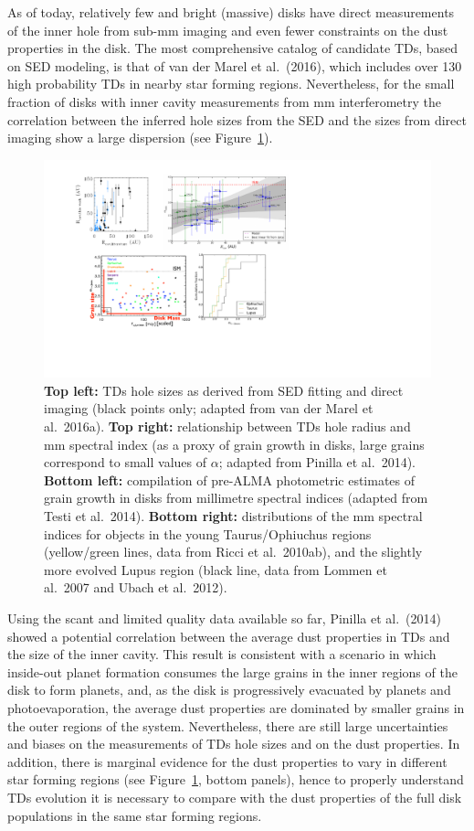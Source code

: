 \documentclass[10pt,fleqn,twoside]{article}
\begin{document}
As of today, relatively few and bright (massive) disks have direct measurements of the inner hole from sub-mm imaging
and even fewer constraints on the dust properties in the disk. The most comprehensive catalog of candidate TDs, based on SED modeling, is that of van der Marel et al.~(2016), which includes over 130 high probability TDs in nearby star forming regions. Nevertheless, for the small fraction of disks with inner cavity measurements from mm interferometry the correlation between the inferred hole sizes from the SED and the sizes from direct imaging show a large dispersion (see Figure~\ref{f_TDsiz}). 
\begin{figure}
\includegraphics[scale=0.7]{f_dust_radii_tds.pdf}
\caption{{\bf Top left:} TDs hole sizes as derived from SED fitting and direct imaging (black points only; adapted from van der Marel et al.~2016a). {\bf Top right:} relationship between TDs hole radius and mm spectral index (as a proxy of grain growth in disks, large grains correspond to small values of $\alpha$; adapted from Pinilla et al.~2014). {\bf Bottom left:} compilation of pre-ALMA photometric estimates of grain growth in disks from millimetre spectral indices (adapted from Testi et al.~2014). {\bf Bottom right:} distributions of the mm spectral indices for objects in the young Taurus/Ophiuchus regions (yellow/green lines, data from Ricci et al.~2010ab), and the slightly more evolved Lupus region (black line, data from Lommen et al.~2007 and Ubach et al.~2012).}
\label{f_TDsiz}
\end{figure}
Using the scant and limited quality data available so far, Pinilla et al.~(2014) showed a potential correlation between the average dust properties in TDs and the size of the inner cavity. This result is consistent with a scenario in which inside-out planet formation consumes the large grains in the inner regions of the disk to form planets, and, as the disk is progressively evacuated by planets and photoevaporation, the average dust properties are dominated by smaller grains in the outer regions of the
system. Nevertheless, there are still large uncertainties and biases on the measurements of TDs hole sizes and on the dust properties. In addition, there is marginal evidence for the dust properties to vary in different star forming regions (see Figure~\ref{f_TDsiz}, bottom panels), hence to properly understand TDs  evolution it is necessary to compare with the dust properties of the full disk populations in the same star forming regions.
\end{document}
